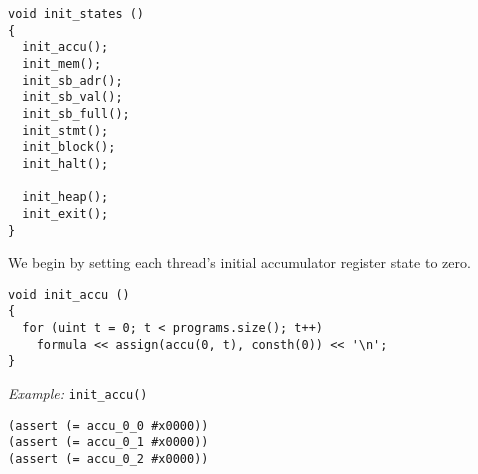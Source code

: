 \begin{lstlisting}[style=c++]
void init_states ()
{
  init_accu();
  init_mem();
  init_sb_adr();
  init_sb_val();
  init_sb_full();
  init_stmt();
  init_block();
  init_halt();

  init_heap();
  init_exit();
}
\end{lstlisting}



\noindent
We begin by setting each thread's initial accumulator register state to zero.

\begin{lstlisting}[style=c++]
void init_accu ()
{
  for (uint t = 0; t < programs.size(); t++)
    formula << assign(accu(0, t), consth(0)) << '\n';
}
\end{lstlisting}

\noindent
\emph{Example:} \lstinline[style=c++]{init_accu()}

\begin{lstlisting}[language=smtlib]
(assert (= accu_0_0 #x0000))
(assert (= accu_0_1 #x0000))
(assert (= accu_0_2 #x0000))
\end{lstlisting}




